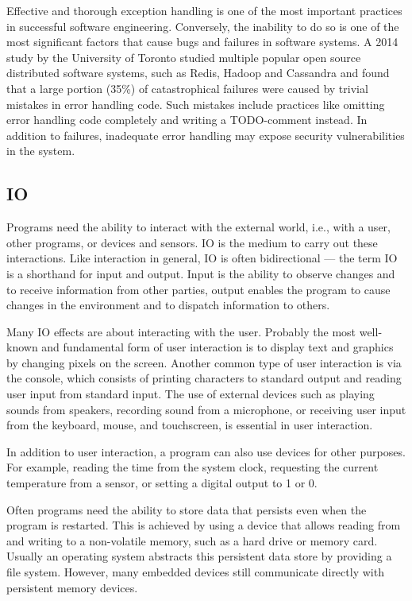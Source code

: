 Effective and thorough exception handling is one of the most important practices in successful software engineering. Conversely, the inability to do so is one of the most significant factors that cause bugs and failures in software systems. A 2014 study by the University of Toronto studied multiple popular open source distributed software systems, such as Redis, Hadoop and Cassandra and found that a large portion (35\%) of catastrophical failures were caused by trivial mistakes in error handling code. Such mistakes include practices like omitting error handling code completely and writing a TODO-comment instead. In addition to failures, inadequate error handling may expose security vulnerabilities in the system.~\cite{simple-testing-failures}


\subsection{IO}
Programs need the ability to interact with the external world, i.e., with a user, other programs, or devices and sensors. IO is the medium to carry out these interactions. Like interaction in general, IO is often bidirectional --- the term IO is a shorthand for input and output. Input is the ability to observe changes and to receive information from other parties, output enables the program to cause changes in the environment and to dispatch information to others.

Many IO effects are about interacting with the user. Probably the most well-known and fundamental form of user interaction is to display text and graphics by changing pixels on the screen. Another common type of user interaction is via the console, which consists of printing characters to standard output and reading user input from standard input. The use of external devices such as playing sounds from speakers, recording sound from a microphone, or receiving user input from the keyboard, mouse, and touchscreen, is essential in user interaction.

In addition to user interaction, a program can also use devices for other purposes. For example, reading the time from the system clock, requesting the current temperature from a sensor, or setting a digital output to 1 or 0.

Often programs need the ability to store data that persists even when the program is restarted. This is achieved by using a device that allows reading from and writing to a non-volatile memory, such as a hard drive or memory card. Usually an operating system abstracts this persistent data store by providing a file system. However, many embedded devices still communicate directly with persistent memory devices.

